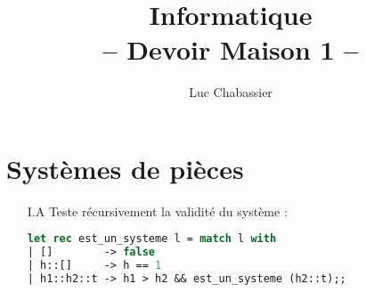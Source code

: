 \documentclass{article}
\title{Informatique\\-- Devoir Maison 1 --}
\author{Luc Chabassier}
\begin{document}
\maketitle
\section{Systèmes de pièces}
\begin{enumerate}
    \item[I.A] Teste récursivement la validité du système :
        \begin{lstlisting}[language=Caml]
let rec est_un_systeme l = match l with
| []        -> false
| h::[]     -> h == 1
| h1::h2::t -> h1 > h2 && est_un_systeme (h2::t);;
        \end{lstlisting}
\end{enumerate}
\end{document}
